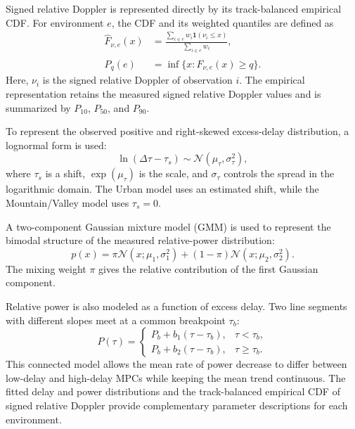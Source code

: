 \documentclass[conference]{IEEEtran}
\begin{document}
Signed relative Doppler is represented directly by its track-balanced empirical CDF. For environment $e$, the CDF and its weighted quantiles are defined as
\begin{equation}
\begin{aligned}
\widehat F_{\nu,e}(x)
&=\frac{\sum_{i\in e}w_i\mathbf{1}(\nu_i\le x)}
{\sum_{i\in e}w_i},\\
P_q(e)&=\inf\{x:\widehat F_{\nu,e}(x)\ge q\}.
\end{aligned}
\label{eq:doppler-ecdf}
\end{equation}
Here, $\nu_i$ is the signed relative Doppler of observation $i$. The empirical representation retains the measured signed relative Doppler values and is summarized by $P_{10}$, $P_{50}$, and $P_{90}$.

To represent the observed positive and right-skewed excess-delay distribution, a lognormal form is used:
\begin{equation}
\ln(\Delta\tau-\tau_s)\sim\mathcal N(\mu_\tau,\sigma_\tau^2),
\label{eq:lognormal}
\end{equation}
where $\tau_s$ is a shift, $\exp(\mu_\tau)$ is the scale, and $\sigma_\tau$ controls the spread in the logarithmic domain. The Urban model uses an estimated shift, while the Mountain/Valley model uses $\tau_s=0$.

A two-component Gaussian mixture model (GMM) is used to represent the bimodal structure of the measured relative-power distribution:
\begin{equation}
p(x)=\pi\mathcal N(x;\mu_1,\sigma_1^2)
+(1-\pi)\mathcal N(x;\mu_2,\sigma_2^2).
\label{eq:gmm2}
\end{equation}
The mixing weight $\pi$ gives the relative contribution of the first Gaussian component.

Relative power is also modeled as a function of excess delay. Two line segments with different slopes meet at a common breakpoint $\tau_b$:
\begin{equation}
P(\tau)=
\begin{cases}
P_b+b_1(\tau-\tau_b), & \tau<\tau_b,\\
P_b+b_2(\tau-\tau_b), & \tau\ge\tau_b.
\end{cases}
\label{eq:piecewise}
\end{equation}
This connected model allows the mean rate of power decrease to differ between low-delay and high-delay MPCs while keeping the mean trend continuous. The fitted delay and power distributions and the track-balanced empirical CDF of signed relative Doppler provide complementary parameter descriptions for each environment.
\end{document}
